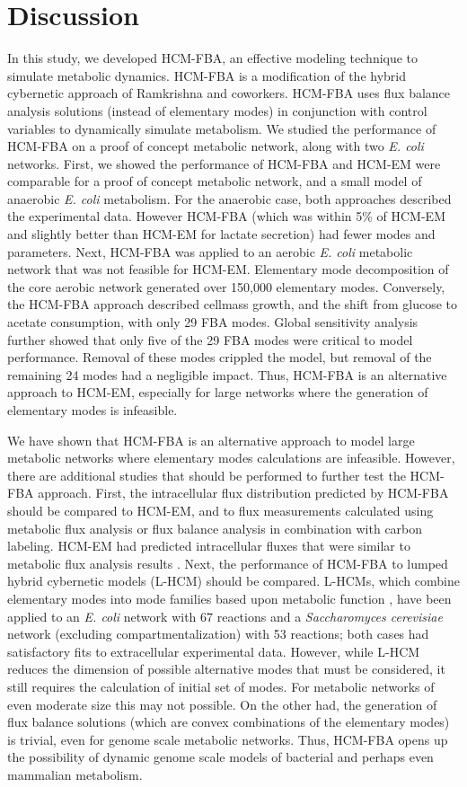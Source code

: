 \documentclass[10pt,twocolumn,twoside,final]{IEEEtran}
\begin{document}
\section{Discussion}
In this study, we developed HCM-FBA, an effective modeling technique to simulate metabolic dynamics.
HCM-FBA is a modification of the hybrid cybernetic approach of Ramkrishna and coworkers.
HCM-FBA uses flux balance analysis solutions (instead of elementary modes) in conjunction with control variables to dynamically simulate metabolism.
We studied the performance of HCM-FBA on a proof of concept metabolic network, along with two \emph{E. coli} networks.
First, we showed the performance of HCM-FBA and HCM-EM were comparable for a proof of concept metabolic network, and a small model of anaerobic \textit{E. coli} metabolism.
For the anaerobic case, both approaches described the experimental data.
However HCM-FBA (which was within 5\% of HCM-EM and slightly better than HCM-EM for lactate secretion) had fewer modes and parameters.
Next, HCM-FBA was applied to an aerobic \textit{E. coli} metabolic network that was not feasible for HCM-EM.
Elementary mode decomposition of the core aerobic network generated over 150,000 elementary modes.
Conversely, the HCM-FBA approach described cellmass growth, and the shift from glucose to acetate consumption, with only 29 FBA modes.
Global sensitivity analysis further showed that only five of the 29 FBA modes were critical to model performance.
Removal of these modes crippled the model, but removal of the remaining 24 modes had a negligible impact.
Thus, HCM-FBA is an alternative approach to HCM-EM, especially for large networks where the generation of elementary modes is infeasible.

We have shown that HCM-FBA is an alternative approach to model large metabolic networks where elementary modes calculations are infeasible.
However, there are additional studies that should be performed to further test the HCM-FBA approach.
First, the intracellular flux distribution predicted by HCM-FBA should be compared to HCM-EM, and to flux measurements calculated using metabolic flux analysis or flux balance analysis in combination with carbon labeling.
HCM-EM had predicted intracellular fluxes that were similar to metabolic flux analysis results \cite{2008_kim_varner_ramkrishna_BiotechProg}.
Next, the performance of HCM-FBA to lumped hybrid cybernetic models (L-HCM) should be compared.
L-HCMs, which combine elementary modes into mode families based upon metabolic function \cite{2010_song,Song:2011aa},
have been applied to an \textit{E. coli} network with 67 reactions and a \textit{Saccharomyces cerevisiae} network (excluding compartmentalization) with 53 reactions;
both cases had satisfactory fits to extracellular experimental data.
However, while L-HCM reduces the dimension of possible alternative modes that must be considered, it still requires the calculation of initial set of modes.
For metabolic networks of even moderate size this may not possible.
On the other had, the generation of flux balance solutions (which are convex combinations of the elementary modes) is trivial, even for genome scale metabolic networks.
Thus, HCM-FBA opens up the possibility of dynamic genome scale models of bacterial and perhaps even mammalian metabolism.
\end{document}
